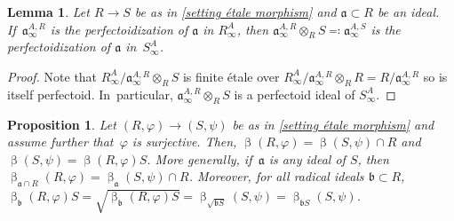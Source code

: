 \documentclass[11pt]{article}
\let\autoref\cref
\theoremstyle{plain}
\newtheorem{proposition}[theorem]{Proposition}
\newtheorem{lemma}[theorem]{Lemma}
\theoremstyle{definition}
\numberwithin{equation}{theorem}
\let\tensor\otimes
\newcommand{\fra}{\mathfrak{a}}
\newcommand{\frab}{\mathfrak{b}}
\renewcommand{\phi}{\varphi}
\newcommand{\rphi}{(R,\phi)}
\newcommand{\spsi}{(S,\psi)}
\newcommand{\rafty}{R^A_\infty}
\newcommand{\safty}{S^A_\infty}
\begin{document}
\begin{lemma}\label{lemma extension of perfectoid ideal étale case}
Let $R\to S$ be as in \autoref{setting étale morphism} and $\fra\subset R$ be an ideal. If~$\fra^{A,R}_\infty$ is the perfectoidization of $\fra$ in $\rafty$, then $\fra^{A,R}_\infty\tensor_R S\eqqcolon\fra^{A,S}_\infty$ is the perfectoidization of $\fra$ in~$\safty$.
\end{lemma}

\begin{proof}
Note that $\rafty/\fra^{A,R}_\infty\tensor_R S$ is finite étale over $\rafty/\fra^{A,R}_\infty\tensor_R R= R/\fra^{A,R}_\infty$ so is itself perfectoid. In~particular, $\fra^{A,R}_\infty\tensor_R S$ is a perfectoid ideal of $\safty$.
\end{proof}

\begin{proposition}\label{behavior beta étale morphism}
Let $\rphi\to\spsi$ be as in \autoref{setting étale morphism} and assume further that~$\phi$ is surjective. Then, $\upbeta\rphi=\upbeta\spsi\cap R$ and $\upbeta\spsi=\upbeta\rphi S$. More generally, if~$\fra$ is any ideal of $S$, then $\upbeta_{\fra\cap R} \rphi=\upbeta_\fra \spsi \cap R$.
Moreover, for all radical ideals $\frab\subset R$, $\upbeta_\frab\rphi S=\sqrt{\upbeta_\frab\rphi S}=\upbeta_{\sqrt{\frab S}}\spsi=\upbeta_{\frab S}\spsi$.
\end{proposition}
\end{document}
